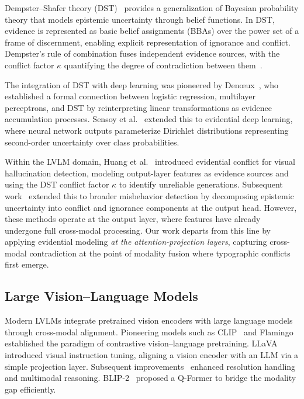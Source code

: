 \documentclass[preprint,12pt]{elsarticle}
\begin{document}
Dempster--Shafer theory (DST)~\cite{shafer1976theory,dempster1967upper} provides a generalization of Bayesian probability theory that models epistemic uncertainty through belief functions. In DST, evidence is represented as basic belief assignments (BBAs) over the power set of a frame of discernment, enabling explicit representation of ignorance and conflict. Dempster's rule of combination fuses independent evidence sources, with the conflict factor $\kappa$ quantifying the degree of contradiction between them~\cite{smets1993belief}.

The integration of DST with deep learning was pioneered by Den{\oe}ux~\cite{denoeux2019logistic}, who established a formal connection between logistic regression, multilayer perceptrons, and DST by reinterpreting linear transformations as evidence accumulation processes. Sensoy et al.~\cite{sensoy2018evidential} extended this to evidential deep learning, where neural network outputs parameterize Dirichlet distributions representing second-order uncertainty over class probabilities.

Within the LVLM domain, Huang et al.~\cite{huang2025visual} introduced evidential conflict for visual hallucination detection, modeling output-layer features as evidence sources and using the DST conflict factor $\kappa$ to identify unreliable generations. Subsequent work~\cite{huang2026detecting} extended this to broader misbehavior detection by decomposing epistemic uncertainty into conflict and ignorance components at the output head. However, these methods operate at the output layer, where features have already undergone full cross-modal processing. Our work departs from this line by applying evidential modeling \emph{at the attention-projection layers}, capturing cross-modal contradiction at the point of modality fusion where typographic conflicts first emerge.

\subsection{Large Vision--Language Models}

Modern LVLMs integrate pretrained vision encoders with large language models through cross-modal alignment. Pioneering models such as CLIP~\cite{radford2021learning} and Flamingo~\cite{alayrac2022flamingo} established the paradigm of contrastive vision--language pretraining. LLaVA~\cite{liu2023visual} introduced visual instruction tuning, aligning a vision encoder with an LLM via a simple projection layer. Subsequent improvements~\cite{liu2024improved,li2024llava} enhanced resolution handling and multimodal reasoning. BLIP-2~\cite{li2023blip} proposed a Q-Former to bridge the modality gap efficiently.
\end{document}
